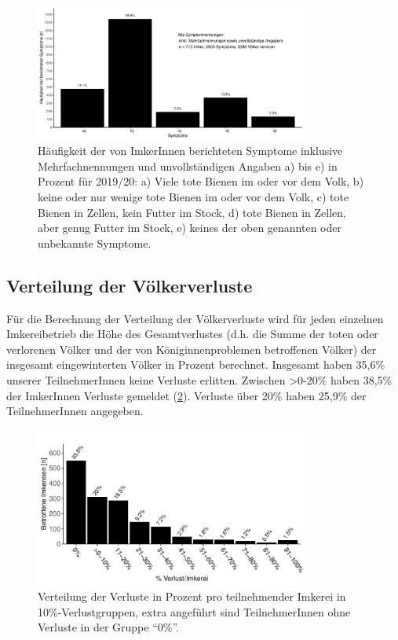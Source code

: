 \begin{figure}[H]
 \centering
 \includegraphics[keepaspectratio,width=0.8\textwidth]{project-U-wintersterblichkeit/figures/plot_symptome}
 \caption{Häufigkeit der von ImkerInnen berichteten Symptome inklusive Mehrfachnennungen und unvollständigen Angaben a) bis e) in Prozent für 2019/20: a) Viele tote Bienen im oder vor dem Volk, b) keine oder nur wenige tote Bienen im oder vor dem Volk, c) tote Bienen in Zellen, kein Futter im Stock, d) tote Bienen in Zellen, aber genug Futter im Stock, e) keines der oben genannten oder unbekannte Symptome.}
 \label{fig:u:loss:symptome}
\end{figure}

\newpage 

\subsection{Verteilung der Völkerverluste}

Für die Berechnung der Verteilung der Völkerverluste wird für jeden einzelnen Imkereibetrieb die Höhe des Gesamtverlustes (d.h. die Summe der toten oder verlorenen Völker und der von Königinnenproblemen betroffenen Völker) der insgesamt eingewinterten Völker in Prozent berechnet. Insgesamt haben 35,6\% unserer TeilnehmerInnen keine Verluste erlitten. Zwischen >0-20\% haben 38,5\% der ImkerInnen Verluste gemeldet (\cref{fig:u:loss:distribution}). Verluste über 20\% haben 25,9\% der TeilnehmerInnen angegeben.

\begin{figure}[H]
  \centering
  \includegraphics[keepaspectratio,width=0.8\textwidth]{project-U-wintersterblichkeit/figures/plot_overview_loss_dist}
  \caption{Verteilung der Verluste in Prozent pro teilnehmender Imkerei in 10\%-Verlustgruppen, extra angeführt sind TeilnehmerInnen ohne Verluste in der Gruppe \enquote{0\%}.}
  \label{fig:u:loss:distribution}
\end{figure}

